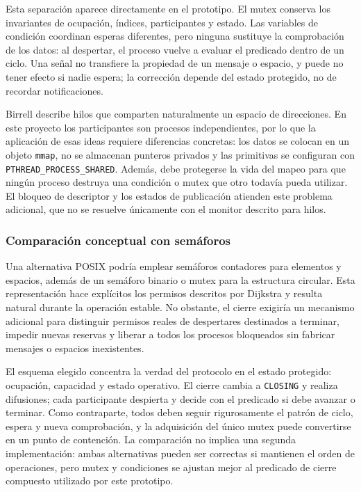 \documentclass[conference]{IEEEtran}
\begin{document}
Esta separación aparece directamente en el prototipo. El mutex conserva los invariantes de ocupación, índices, participantes y estado. Las variables de condición coordinan esperas diferentes, pero ninguna sustituye la comprobación de los datos: al despertar, el proceso vuelve a evaluar el predicado dentro de un ciclo. Una señal no transfiere la propiedad de un mensaje o espacio, y puede no tener efecto si nadie espera; la corrección depende del estado protegido, no de recordar notificaciones.

Birrell describe hilos que comparten naturalmente un espacio de direcciones. En este proyecto los participantes son procesos independientes, por lo que la aplicación de esas ideas requiere diferencias concretas: los datos se colocan en un objeto \texttt{mmap}, no se almacenan punteros privados y las primitivas se configuran con \texttt{PTHREAD\_PROCESS\_SHARED}. Además, debe protegerse la vida del mapeo para que ningún proceso destruya una condición o mutex que otro todavía pueda utilizar. El bloqueo de descriptor y los estados de publicación atienden este problema adicional, que no se resuelve únicamente con el monitor descrito para hilos.

\subsubsection{Comparación conceptual con semáforos}
Una alternativa POSIX podría emplear semáforos contadores para elementos y espacios, además de un semáforo binario o mutex para la estructura circular. Esta representación hace explícitos los permisos descritos por Dijkstra y resulta natural durante la operación estable. No obstante, el cierre exigiría un mecanismo adicional para distinguir permisos reales de despertares destinados a terminar, impedir nuevas reservas y liberar a todos los procesos bloqueados sin fabricar mensajes o espacios inexistentes.

El esquema elegido concentra la verdad del protocolo en el estado protegido: ocupación, capacidad y estado operativo. El cierre cambia a \texttt{CLOSING} y realiza difusiones; cada participante despierta y decide con el predicado si debe avanzar o terminar. Como contraparte, todos deben seguir rigurosamente el patrón de ciclo, espera y nueva comprobación, y la adquisición del único mutex puede convertirse en un punto de contención. La comparación no implica una segunda implementación: ambas alternativas pueden ser correctas si mantienen el orden de operaciones, pero mutex y condiciones se ajustan mejor al predicado de cierre compuesto utilizado por este prototipo.
\end{document}
